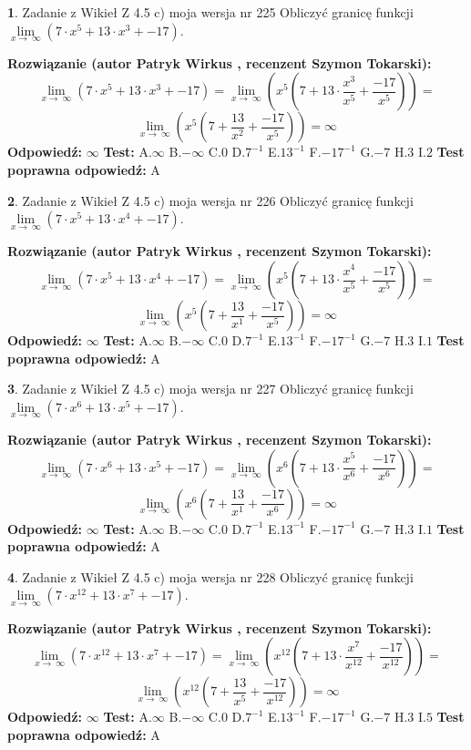 \documentclass[12pt, a4paper]{article}
\theoremstyle{definition} %
\newtheorem{zad}{}
\newcommand{\zadStart}[1]{\begin{zad}#1\newline}
\newcommand{\zadStop}{\end{zad}}
\newcommand{\rozwStart}[2]{\noindent \textbf{Rozwiązanie (autor #1 , recenzent #2): }\newline}
\newcommand{\rozwStop}{\newline}
\newcommand{\odpStart}{\noindent \textbf{Odpowiedź:}\newline}
\newcommand{\odpStop}{\newline}
\newcommand{\testStart}{\noindent \textbf{Test:}\newline}
\newcommand{\testStop}{\newline}
\newcommand{\kluczStart}{\noindent \textbf{Test poprawna odpowiedź:}\newline}
\newcommand{\kluczStop}{\newline}
\begin{document}
\zadStart{Zadanie z Wikieł Z 4.5 c) moja wersja nr 225}
Obliczyć granicę funkcji  $\lim\limits_{x\to\ \infty}(7 \cdot x^{5}+13 \cdot x^{3}+-17)$.
\zadStop
\rozwStart{Patryk Wirkus}{Szymon Tokarski}
$$\lim\limits_{x\to\ \infty}(7 \cdot x^{5}+13 \cdot x^{3}+-17) = \lim\limits_{x\to\ \infty}(x^{5}(7 +13 \cdot \frac{x^{3}}{x^{5}}+\frac{-17}{x^{5}})) =$$ $$\lim\limits_{x\to\ \infty}(x^{5}(7 +\frac{13}{x^{2}}+\frac{-17}{x^{5}})) =\infty$$
\rozwStop
\odpStart
$\infty$
\odpStop
\testStart
A.$\infty$ B.$-\infty$ C.$0$ D.$7^{-1}$ E.$13^{-1}$
F.$-17^{-1}$ G.$-7$
H.$3$
I.$2$
\testStop
\kluczStart
A
\kluczStop



\zadStart{Zadanie z Wikieł Z 4.5 c) moja wersja nr 226}
Obliczyć granicę funkcji  $\lim\limits_{x\to\ \infty}(7 \cdot x^{5}+13 \cdot x^{4}+-17)$.
\zadStop
\rozwStart{Patryk Wirkus}{Szymon Tokarski}
$$\lim\limits_{x\to\ \infty}(7 \cdot x^{5}+13 \cdot x^{4}+-17) = \lim\limits_{x\to\ \infty}(x^{5}(7 +13 \cdot \frac{x^{4}}{x^{5}}+\frac{-17}{x^{5}})) =$$ $$\lim\limits_{x\to\ \infty}(x^{5}(7 +\frac{13}{x^{1}}+\frac{-17}{x^{5}})) =\infty$$
\rozwStop
\odpStart
$\infty$
\odpStop
\testStart
A.$\infty$ B.$-\infty$ C.$0$ D.$7^{-1}$ E.$13^{-1}$
F.$-17^{-1}$ G.$-7$
H.$3$
I.$1$
\testStop
\kluczStart
A
\kluczStop



\zadStart{Zadanie z Wikieł Z 4.5 c) moja wersja nr 227}
Obliczyć granicę funkcji  $\lim\limits_{x\to\ \infty}(7 \cdot x^{6}+13 \cdot x^{5}+-17)$.
\zadStop
\rozwStart{Patryk Wirkus}{Szymon Tokarski}
$$\lim\limits_{x\to\ \infty}(7 \cdot x^{6}+13 \cdot x^{5}+-17) = \lim\limits_{x\to\ \infty}(x^{6}(7 +13 \cdot \frac{x^{5}}{x^{6}}+\frac{-17}{x^{6}})) =$$ $$\lim\limits_{x\to\ \infty}(x^{6}(7 +\frac{13}{x^{1}}+\frac{-17}{x^{6}})) =\infty$$
\rozwStop
\odpStart
$\infty$
\odpStop
\testStart
A.$\infty$ B.$-\infty$ C.$0$ D.$7^{-1}$ E.$13^{-1}$
F.$-17^{-1}$ G.$-7$
H.$3$
I.$1$
\testStop
\kluczStart
A
\kluczStop



\zadStart{Zadanie z Wikieł Z 4.5 c) moja wersja nr 228}
Obliczyć granicę funkcji  $\lim\limits_{x\to\ \infty}(7 \cdot x^{12}+13 \cdot x^{7}+-17)$.
\zadStop
\rozwStart{Patryk Wirkus}{Szymon Tokarski}
$$\lim\limits_{x\to\ \infty}(7 \cdot x^{12}+13 \cdot x^{7}+-17) = \lim\limits_{x\to\ \infty}(x^{12}(7 +13 \cdot \frac{x^{7}}{x^{12}}+\frac{-17}{x^{12}})) =$$ $$\lim\limits_{x\to\ \infty}(x^{12}(7 +\frac{13}{x^{5}}+\frac{-17}{x^{12}})) =\infty$$
\rozwStop
\odpStart
$\infty$
\odpStop
\testStart
A.$\infty$ B.$-\infty$ C.$0$ D.$7^{-1}$ E.$13^{-1}$
F.$-17^{-1}$ G.$-7$
H.$3$
I.$5$
\testStop
\kluczStart
A
\kluczStop
\end{document}
